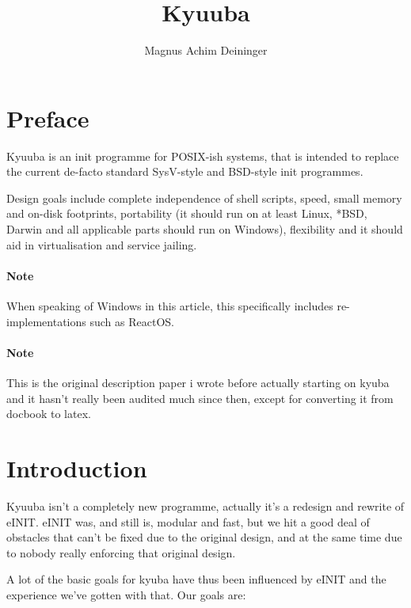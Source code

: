 \documentclass[a4paper,twoside,titlepage]{article}
\title{Kyuuba}
\author{Magnus Achim Deininger}
\begin{document}
\maketitle

\section*{Preface}
Kyuuba is an init programme for POSIX-ish systems, that is intended to replace
the current de-facto standard SysV-style and BSD-style init programmes.

Design goals include complete independence of shell scripts, speed, small memory
and on-disk footprints, portability (it should run on at least Linux, *BSD,
Darwin and all applicable parts should run on Windows), flexibility and it
should aid in virtualisation and service jailing.

\paragraph{Note}
When speaking of Windows in this article, this specifically includes
re-implementations such as ReactOS.

\paragraph{Note}
This is the original description paper i wrote before actually starting on kyuba
and it hasn't really been audited much since then, except for converting it from
docbook to latex.

\section*{Introduction}
Kyuuba isn't a completely new programme, actually it's a redesign and rewrite of
eINIT. eINIT was, and still is, modular and fast, but we hit a good deal of
obstacles that can't be fixed due to the original design, and at the same time
due to nobody really enforcing that original design.

A lot of the basic goals for kyuba have thus been influenced by eINIT and the
experience we've gotten with that. Our goals are:
\end{document}

